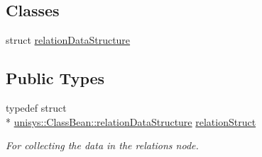 \subsection*{Classes}
\begin{DoxyCompactItemize}
\item 
struct \hyperlink{structunisys_1_1ClassBean_1_1relationDataStructure}{relation\-Data\-Structure}
\end{DoxyCompactItemize}
\subsection*{Public Types}
\begin{DoxyCompactItemize}
\item 
typedef struct \\*
\hyperlink{structunisys_1_1ClassBean_1_1relationDataStructure}{unisys\-::\-Class\-Bean\-::relation\-Data\-Structure} \hyperlink{classunisys_1_1ClassBean_aabeda0465f295816c6f784d7e3cbdb97}{relation\-Struct}
\begin{DoxyCompactList}\small\item\em For collecting the data in the relations node. \end{DoxyCompactList}\end{DoxyCompactItemize}
